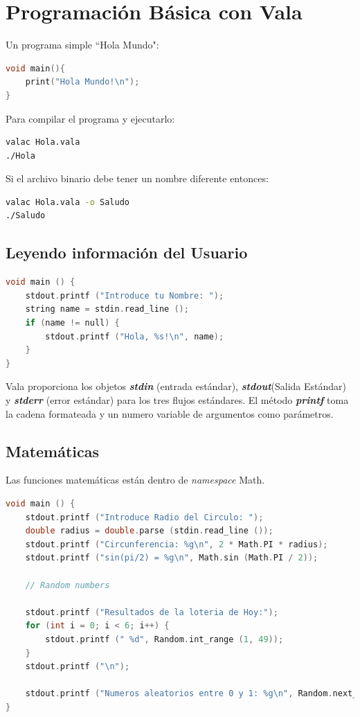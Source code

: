 \documentclass[12pt,twoside]{book}
\begin{document}
\chapter{Programación Básica con Vala}





Un programa simple ``Hola Mundo":
\begin{lstlisting}[language=C++]
void main(){
	print("Hola Mundo!\n");
}
\end{lstlisting}

Para compilar el programa y ejecutarlo:
\begin{lstlisting}[language=bash]
valac Hola.vala
./Hola
\end{lstlisting}

Si el archivo binario debe tener un nombre diferente entonces:

\begin{lstlisting}[language=bash]
valac Hola.vala -o Saludo
./Saludo
\end{lstlisting}



\section{Leyendo información del Usuario}

\begin{lstlisting}[language=C++]
void main () {
	stdout.printf ("Introduce tu Nombre: ");
	string name = stdin.read_line ();
	if (name != null) {
		stdout.printf ("Hola, %s!\n", name);
	}
}
\end{lstlisting}

Vala proporciona los objetos \textbf{\textit{stdin}} (entrada estándar), \textbf{\textit{stdout}}(Salida Estándar) y \textbf{\textit{stderr}} (error estándar) para los tres flujos estándares. El método \textbf{\textit{printf}} toma la cadena formateada y un numero variable de argumentos como parámetros.

\section{Matemáticas}

Las funciones matemáticas están dentro de \textit{namespace} Math.

\begin{lstlisting}[language=C++]
void main () {
	stdout.printf ("Introduce Radio del Circulo: ");
	double radius = double.parse (stdin.read_line ());
	stdout.printf ("Circunferencia: %g\n", 2 * Math.PI * radius);
	stdout.printf ("sin(pi/2) = %g\n", Math.sin (Math.PI / 2));
	
	// Random numbers
	
	stdout.printf ("Resultados de la loteria de Hoy:");
	for (int i = 0; i < 6; i++) {
		stdout.printf (" %d", Random.int_range (1, 49));
	}
	stdout.printf ("\n");
	
	stdout.printf ("Numeros aleatorios entre 0 y 1: %g\n", Random.next_double ());
}
\end{lstlisting}
\end{document}
